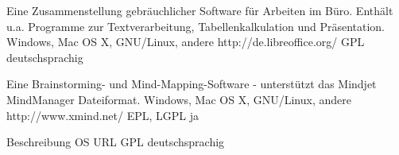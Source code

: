 \documentclass[11pt,a4paper,landscape,twocolumn]{article}
\begin{document}


{Eine Zusammenstellung gebräuchlicher Software für Arbeiten im Büro. Enthält u.a. Programme zur Textverarbeitung, Tabellenkalkulation und Präsentation.}
{Windows, Mac OS X, GNU/Linux, andere}
{http://de.libreoffice.org/}
{GPL}
{deutschsprachig}

{Eine Brainstorming- und Mind-Mapping-Software - unterstützt das Mindjet MindManager Dateiformat.}
{Windows, Mac OS X, GNU/Linux, andere}
{http://www.xmind.net/}
{EPL, LGPL}
{ja}


\newpage %


{Beschreibung}
{OS}
{URL}
{GPL}
{deutschsprachig}
\end{document}
